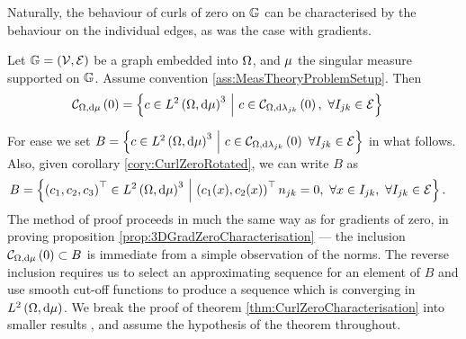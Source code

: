 Naturally, the behaviour of curls of zero on $\mathbb{G}$ can be characterised by the behaviour on the individual edges, as was the case with gradients.
\begin{theorem} \label{thm:CurlZeroCharacterisation}
	Let $\mathbb{G}=\left( \mathcal{V}, \mathcal{E} \right)$ be a graph embedded into $\Omega$, and $\mu$ the singular measure supported on $\mathbb{G}$.
	Assume convention \ref{ass:MeasTheoryProblemSetup}.
	Then
	\begin{align*}
		\mathcal{C}_{ \Omega, \mathrm{d}\mu}\left( 0 \right) &= 
		\left\{  c\in L^{2}\left( \Omega,\mathrm{d}\mu \right)^3 \ \middle\vert \  c\in\mathcal{C}_{ \Omega, \mathrm{d}\lambda_{jk}}\left( 0 \right), \ \forall I_{jk}\in\mathcal{E}  \right\}
	\end{align*}
\end{theorem}
For ease we set $B = \left\{  c\in L^{2}\left( \Omega,\mathrm{d}\mu \right)^3 \ \middle\vert \  c\in\mathcal{C}_{ \Omega, \mathrm{d}\lambda_{jk}}\left( 0 \right) \ \forall I_{jk}\in\mathcal{E}  \right\}$ in what follows.
Also, given corollary \ref{cory:CurlZeroRotated}, we can write $B$ as
\begin{align*}
	B &= \left\{  \left( c_1, c_2, c_3 \right)^\top\in L^{2}\left( \Omega,\mathrm{d}\mu \right)^3 \ \middle\vert \  \left( c_1(x), c_2(x) \right)^\top n_{jk}=0, \ \forall x\in I_{jk}, \ \forall I_{jk}\in\mathcal{E}  \right\}.
\end{align*}
The method of proof proceeds in much the same way as for gradients of zero, in proving proposition \ref{prop:3DGradZeroCharacterisation} --- the inclusion $\mathcal{C}_{ \Omega, \mathrm{d}\mu}\left( 0 \right)\subset B$ is immediate from a simple observation of the norms.
The reverse inclusion requires us to select an approximating sequence for an element of $B$ and use smooth cut-off functions to produce a sequence which is converging in $L^{2}\left( \Omega,\mathrm{d}\mu \right)$.
We break the proof of theorem \ref{thm:CurlZeroCharacterisation} into smaller results , and assume the hypothesis of the theorem throughout.

